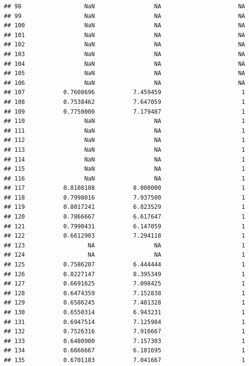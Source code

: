 \documentclass[]{article}
\begin{document}
\begin{verbatim}
## 98                  NaN                 NA                      NA
## 99                  NaN                 NA                      NA
## 100                 NaN                 NA                      NA
## 101                 NaN                 NA                      NA
## 102                 NaN                 NA                      NA
## 103                 NaN                 NA                      NA
## 104                 NaN                 NA                      NA
## 105                 NaN                 NA                      NA
## 106                 NaN                 NA                      NA
## 107           0.7608696           7.459459                       1
## 108           0.7538462           7.647059                       1
## 109           0.7750000           7.179487                       1
## 110                 NaN                 NA                       1
## 111                 NaN                 NA                       1
## 112                 NaN                 NA                       1
## 113                 NaN                 NA                       1
## 114                 NaN                 NA                       1
## 115                 NaN                 NA                       1
## 116                 NaN                 NA                       1
## 117           0.8108108           8.000000                       1
## 118           0.7998016           7.937500                       1
## 119           0.8017241           6.823529                       1
## 120           0.7866667           6.617647                       1
## 121           0.7990431           6.147059                       1
## 122           0.6612903           7.294118                       1
## 123                  NA                 NA                       1
## 124                  NA                 NA                       1
## 125           0.7586207           6.444444                       1
## 126           0.8227147           8.395349                       1
## 127           0.6691625           7.098425                       1
## 128           0.6474359           7.152838                       1
## 129           0.6586245           7.481328                       1
## 130           0.6550314           6.943231                       1
## 131           0.6947514           7.125984                       1
## 132           0.7526316           7.916667                       1
## 133           0.6480900           7.157303                       1
## 134           0.6666667           6.101695                       1
## 135           0.6701183           7.041667                       1

\end{verbatim}
\end{document}
